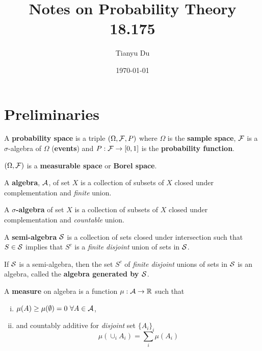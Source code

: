 \documentclass[11pt]{article}
\title{Notes on Probability Theory \\ 18.175}
\date{\today}
\author{Tianyu Du}
\begin{document}
	\maketitle
	\tableofcontents
	
	\section{Preliminaries}
		\begin{definition}
			A \textbf{probability space} is a triple $(\Omega, \mathcal{{F}}, P)$ where $\Omega$ is the \textbf{sample space}, $\mathcal{{F}}$ is a $\sigma$-algebra of $\Omega$ (\textbf{events}) and $P: \mathcal{{F}} \to [0,1]$ is the \textbf{probability function}.
		\end{definition}

		\begin{remark}
			$(\Omega, \mathcal{{F}})$ is a \textbf{measurable space} or \textbf{Borel space}.
		\end{remark}
		
		\begin{definition}
			A \textbf{algebra}, $\mathcal{{A}}$, of set $X$ is a collection of subsets of $X$ closed under complementation and \emph{finite} union.
		\end{definition}
		
		\begin{definition}
			A \textbf{$\sigma$-algebra} of set $X$ is a collection of subsets of $X$ closed under complementation and \emph{countable} union.
		\end{definition}
		
		\begin{definition}
			A \textbf{semi-algebra} $\mathcal{{S}}$ is a collection of sets closed under intersection such that $S \in \mathcal{{S}}$ implies that $S^c$ is a \emph{finite disjoint} union of sets in $\mathcal{{S}}$.
		\end{definition}
		
		\begin{lemma}
			If $\mathcal{{S}}$ is a semi-algebra, then the set $S^c$ of \emph{finite disjoint} unions of sets in $\mathcal{{S}}$ is an algebra, called the \textbf{algebra generated by $\mathcal{{S}}$}.
		\end{lemma}
		
		\begin{definition}
			A \textbf{measure} on algebra is a function $\mu: \mathcal{{A}} \to \mathbb{R}$ such that
			\begin{enumerate}[(i)]
				\item $\mu(A) \geq \mu(\emptyset) = 0\ \forall A \in \mc{A}$,
				\item and countably additive for \emph{disjoint} set $\{A_i\}_i$
				\begin{equation}
					\mu(\cup_i A_i) = \sum_i \mu(A_i)
				\end{equation}
			\end{enumerate}
		\end{definition}
		
\end{document}
